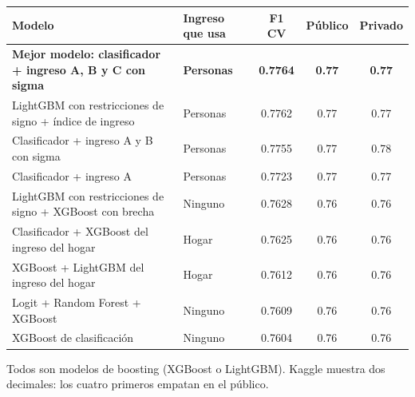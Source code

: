 
\begin{threeparttable}
\begin{tabular}[t]{llccc}
\toprule
Modelo & Ingreso que usa & F1 CV & Público & Privado\\
\midrule
\textbf{Mejor modelo: clasificador + ingreso A, B y C con sigma} & \textbf{Personas} & \textbf{0.7764} & \textbf{0.77} & \textbf{0.77}\\
LightGBM con restricciones de signo + índice de ingreso & Personas & 0.7762 & 0.77 & 0.77\\
Clasificador + ingreso A y B con sigma & Personas & 0.7755 & 0.77 & 0.78\\
Clasificador + ingreso A & Personas & 0.7723 & 0.77 & 0.77\\
\midrule
LightGBM con restricciones de signo + XGBoost con brecha & Ninguno & 0.7628 & 0.76 & 0.76\\
Clasificador + XGBoost del ingreso del hogar & Hogar & 0.7625 & 0.76 & 0.76\\
XGBoost + LightGBM del ingreso del hogar & Hogar & 0.7612 & 0.76 & 0.76\\
Logit + Random Forest + XGBoost & Ninguno & 0.7609 & 0.76 & 0.76\\
XGBoost de clasificación & Ninguno & 0.7604 & 0.76 & 0.76\\
\bottomrule
\end{tabular}
\begin{tablenotes}
\item Todos son modelos de boosting (XGBoost o LightGBM). Kaggle muestra dos decimales: los cuatro primeros empatan en el público.
\end{tablenotes}
\end{threeparttable}
